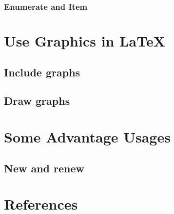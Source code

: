 \documentclass{beamer}
\begin{document}
\begin{frame}
	\frametitle{Enumerate and Item}


\end{frame}
\begin{frame}

\end{frame}

\section{Use Graphics in \LaTeX}
\begin{frame}
\end{frame}

\subsection{Include graphs}

\begin{frame}

\end{frame}

\subsection{Draw graphs}

\begin{frame}

\end{frame}

\section{Some Advantage Usages}
\begin{frame}
\end{frame}

\subsection{New and renew}

\begin{frame}

\end{frame}

\section{References}
\begin{frame}
\end{frame}
\end{document}
